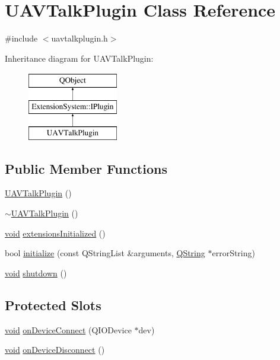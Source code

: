 \hypertarget{class_u_a_v_talk_plugin}{\section{U\-A\-V\-Talk\-Plugin Class Reference}
\label{class_u_a_v_talk_plugin}
}


{\ttfamily \#include $<$uavtalkplugin.\-h$>$}

Inheritance diagram for U\-A\-V\-Talk\-Plugin\-:\begin{figure}[H]
\begin{center}
\leavevmode
\includegraphics[height=3.000000cm]{class_u_a_v_talk_plugin}
\end{center}
\end{figure}
\subsection*{Public Member Functions}
\begin{DoxyCompactItemize}
\item 
\hyperlink{group___u_a_v_talk_plugin_ga140bdf803c218ccb2a6017a2a6aba95e}{U\-A\-V\-Talk\-Plugin} ()
\item 
\hyperlink{group___u_a_v_talk_plugin_gab4102ef2791ea82b9460336b06361158}{$\sim$\-U\-A\-V\-Talk\-Plugin} ()
\item 
\hyperlink{group___u_a_v_objects_plugin_ga444cf2ff3f0ecbe028adce838d373f5c}{void} \hyperlink{group___u_a_v_talk_plugin_ga2b7202eb07a1d037f8e92eeedbc1621e}{extensions\-Initialized} ()
\item 
bool \hyperlink{group___u_a_v_talk_plugin_ga311f58f272717ad544a6ca019a42f821}{initialize} (const Q\-String\-List \&arguments, \hyperlink{group___u_a_v_objects_plugin_gab9d252f49c333c94a72f97ce3105a32d}{Q\-String} $\ast$error\-String)
\item 
\hyperlink{group___u_a_v_objects_plugin_ga444cf2ff3f0ecbe028adce838d373f5c}{void} \hyperlink{group___u_a_v_talk_plugin_ga67b3b23618210b3dfbf43dc1b0fa03b1}{shutdown} ()
\end{DoxyCompactItemize}
\subsection*{Protected Slots}
\begin{DoxyCompactItemize}
\item 
\hyperlink{group___u_a_v_objects_plugin_ga444cf2ff3f0ecbe028adce838d373f5c}{void} \hyperlink{group___u_a_v_talk_plugin_ga496d6211736a7cfd5cee129eb2b8ad95}{on\-Device\-Connect} (Q\-I\-O\-Device $\ast$dev)
\item 
\hyperlink{group___u_a_v_objects_plugin_ga444cf2ff3f0ecbe028adce838d373f5c}{void} \hyperlink{group___u_a_v_talk_plugin_ga1ac9b2c0c21d66d603c639183ebcd7db}{on\-Device\-Disconnect} ()
\end{DoxyCompactItemize}


